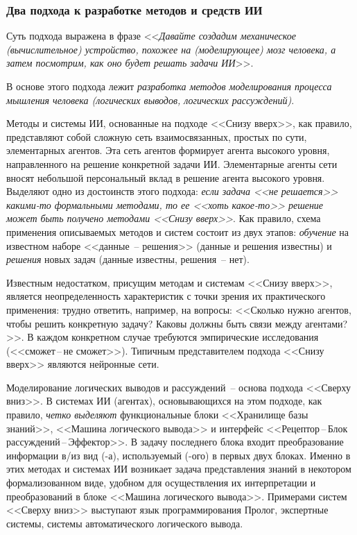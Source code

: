 \documentclass[a4paper,14pt, openany, twoside, final]{extbook} %
\begin{document}
\subsubsection*{Два подхода к разработке методов и средств ИИ}
\begin{mygroup}
\begin{description}[style=unboxed,leftmargin=0pt,labelindent=\parindent]
\item[<<Снизу вверх>>.] Суть подхода выражена в фразе <<{\em Давайте создадим механическое (вычислительное) устройство, похожее на (моделирующее) мозг человека, а затем посмотрим, как оно будет решать задачи ИИ}>>.
\item[<<Сверху вниз>>.] В основе этого подхода лежит {\em разработка методов моделирования процесса мышления человека (логических выводов, логических рассуждений)}.
\end{description}

Методы и системы ИИ, основанные на подходе <<Снизу вверх>>, как правило, представляют собой сложную сеть взаимосвязанных, простых по сути, элементарных агентов. Эта сеть агентов формирует агента высокого уровня, направленного на решение конкретной задачи ИИ. Элементарные агенты сети вносят небольшой персональный вклад в решение агента высокого уровня. Выделяют одно из достоинств этого подхода: {\em если задача <<не решается>> какими-то формальными методами, то ее <<хоть какое-то>> решение может быть получено методами <<Снизу вверх>>}. Как правило, схема применения описываемых методов и систем состоит из двух этапов: {\em обучение} на известном наборе <<данные~-- решения>> (данные и решения известны) и {\em решения} новых задач (данные известны, решения~-- нет).

Известным недостатком, присущим методам и системам <<Снизу вверх>>, является неопределенность характеристик с точки зрения их практического применения: трудно ответить, например, на вопросы: <<Сколько нужно агентов, чтобы решить конкретную задачу? Каковы должны быть связи между агентами?>>. В каждом конкретном случае требуются эмпирические исследования (<<сможет\,{}--\,{}не сможет>>).  Типичным представителем подхода <<Снизу вверх>> являются нейронные сети.

Моделирование логических выводов и рассуждений~-- основа подхода <<Сверху вниз>>. В системах ИИ (агентах), основывающихся на этом подходе, как правило, {\em четко выделяют} функциональные блоки <<Хранилище базы знаний>>, <<Машина логического вывода>> и интерфейс <<Рецептор\,{}--\,{}Блок  рассуждений\,{}--\,{}Эффектор>>. В задачу последнего блока входит преобразование информации в/из вид (-а), используемый (-ого) в первых двух блоках. Именно в этих методах и системах ИИ возникает задача представления знаний в некотором формализованном виде, удобном для осуществления их интерпретации и преобразований в блоке <<Машина логического вывода>>. Примерами систем <<Сверху вниз>> выступают язык программирования Пролог, экспертные системы, системы автоматического логического вывода.
\end{mygroup}
\end{document}
